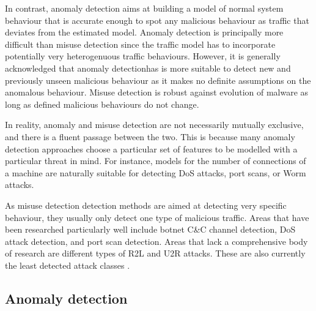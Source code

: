 \documentclass[a4paper,12pt,twoside]{article}
\begin{document}
In contrast, anomaly detection aims at building a model of normal system behaviour that is accurate enough to spot any malicious behaviour as traffic that deviates from the estimated model. Anomaly detection is principally more difficult than misuse detection since the traffic model has to incorporate potentially very heterogenuous traffic behaviours. However, it is generally acknowledged that anomaly detectionhas is more suitable to detect new and previously unseen malicious behaviour as it makes no definite assumptions on the anomalous behaviour. Misuse detection is robust against evolution of malware as long as defined malicious behaviours do not change.

In reality, anomaly and misuse detection are not necessarily mutually exclusive, and there is a fluent passage between the two. This is because many anomaly detection approaches choose a particular set of features to be modelled with a particular threat in mind. For instance, models for the number of connections of a machine are naturally suitable for detecting DoS attacks, port scans, or Worm attacks. 

As misuse detection detection methods are aimed at detecting very specific behaviour, they usually only detect one type of malicious traffic. Areas that have been researched particularly well include botnet C\&C channel detection, DoS attack detection, and port scan detection. Areas that lack a comprehensive body of research are different types of R2L and U2R attacks. These are also currently the least   detected   attack   classes \cite{nisioti2018intrusion}.

\subsection{Anomaly detection}
\end{document}
